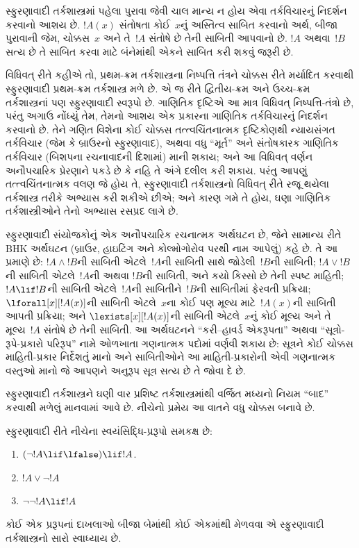 સ્ફુરણાવાદી તર્કશાસ્ત્રમાં પહેલા પુરાવા જેવી ચાલ માન્ય ન હોય એવા
તર્કવિચારનું નિદર્શન કરવાનો આશય છે. $!A(x)$ સંતોષતા કોઈ~$x$નું
અસ્તિત્વ સાબિત કરવાનો અર્થ, બીજા પુરાવાની જેમ, ચોક્કસ~$x$ અને તે~$!A$
સંતોષે છે તેની સાબિતી આપવાનો છે. $!A$ અથવા~$!B$ સત્ય છે તે સાબિત કરવા
માટે બંનેમાંથી એકને સાબિત કરી શકવું જરૂરી છે.

વિધિવત્ રીતે કહીએ તો, પ્રથમ-ક્રમ તર્કશાસ્ત્રના નિષ્પત્તિ તંત્રને
ચોક્કસ રીતે મર્યાદિત કરવાથી સ્ફુરણાવાદી પ્રથમ-ક્રમ તર્કશાસ્ત્ર મળે છે.
એ જ રીતે દ્વિતીય-ક્રમ અને ઉચ્ચ-ક્રમ તર્કશાસ્ત્રનાં પણ સ્ફુરણાવાદી
સ્વરૂપો છે. ગાણિતિક દૃષ્ટિએ આ માત્ર વિધિવત્ નિષ્પત્તિ-તંત્રો છે, પરંતુ
અગાઉ નોંધ્યું તેમ, તેમનો આશય એક પ્રકારના ગાણિતિક તર્કવિચારનું નિદર્શન
કરવાનો છે. તેને ગણિત વિશેના કોઈ ચોક્કસ તત્ત્વચિંતનાત્મક દૃષ્ટિકોણથી
ન્યાયસંગત તર્કવિચાર (જેમ કે બ્રાઉરનો સ્ફુરણાવાદ), અથવા વધુ ``મૂર્ત''
અને સંતોષકારક ગાણિતિક તર્કવિચાર (બિશપના રચનાવાદની દિશામાં) માની શકાય;
અને આ વિધિવત્ વર્ણન અનૌપચારિક પ્રેરણાને પકડે છે કે નહિ તે અંગે દલીલ
કરી શકાય. પરંતુ આપણું તત્ત્વચિંતનાત્મક વલણ જે હોય તે, સ્ફુરણાવાદી
તર્કશાસ્ત્રનો વિધિવત્ રીતે રજૂ થયેલા તર્કશાસ્ત્ર તરીકે અભ્યાસ કરી
શકીએ છીએ; અને કારણ ગમે તે હોય, ઘણા ગાણિતિક તર્કશાસ્ત્રીઓને તેનો
અભ્યાસ રસપ્રદ લાગે છે.

સ્ફુરણાવાદી સંયોજકોનું એક અનૌપચારિક રચનાત્મક અર્થઘટન છે, જેને સામાન્ય
રીતે BHK અર્થઘટન (બ્રાઉર, હાઇટિંગ અને કોલ્મોગોરોવ પરથી નામ આપેલું)
કહે છે. તે આ પ્રમાણે છે: $!A \land !B$ની સાબિતી એટલે~$!A$ની સાબિતી
સાથે જોડેલી~$!B$ની સાબિતી; $!A \lor !B$ની સાબિતી એટલે~$!A$ની અથવા
$!B$ની સાબિતી, અને કયો કિસ્સો છે તેની સ્પષ્ટ માહિતી; $!A \lif !B$ની
સાબિતી એટલે~$!A$ની સાબિતીને~$!B$ની સાબિતીમાં ફેરવતી પ્રક્રિયા;
$\lforall[x][!A(x)]$ની સાબિતી એટલે~$x$ના કોઈ પણ મૂલ્ય માટે~$!A(x)$ની
સાબિતી આપતી પ્રક્રિયા; અને $\lexists[x][!A(x)]$ની સાબિતી એટલે~$x$નું
કોઈ મૂલ્ય અને તે મૂલ્ય~$!A$ સંતોષે છે તેની સાબિતી. આ અર્થઘટનને
``કરી--હાવર્ડ એકરૂપતા'' અથવા ``સૂત્રો-રૂપે-પ્રકારો પરિરૂપ'' નામે
ઓળખાતા ગણનાત્મક પદોમાં વર્ણવી શકાય છે: સૂત્રને કોઈ ચોક્કસ
માહિતી-પ્રકાર નિર્દેશતું માનો અને સાબિતીઓને આ માહિતી-પ્રકારોની એવી
ગણનાત્મક વસ્તુઓ માનો જે આપણને અનુરૂપ સૂત્ર સત્ય છે તે જોવા દે છે.

સ્ફુરણાવાદી તર્કશાસ્ત્રને ઘણી વાર પ્રશિષ્ટ તર્કશાસ્ત્રમાંથી વર્જિત
મધ્યનો નિયમ ``બાદ'' કરવાથી મળેલું માનવામાં આવે છે. નીચેનો પ્રમેય આ
વાતને વધુ ચોક્કસ બનાવે છે.
\begin{thm}
સ્ફુરણાવાદી રીતે નીચેના સ્વયંસિદ્ધિ-પ્રરૂપો સમકક્ષ છે:
\begin{enumerate}
\item $(\lnot !A \lif \lfalse) \lif !A$.
\item $!A \lor \lnot !A$
\item $\lnot \lnot !A \lif !A$
\end{enumerate}
\end{thm}
કોઈ એક પ્રરૂપનાં દાખલાઓ બીજા બેમાંથી કોઈ એકમાંથી મેળવવા એ સ્ફુરણાવાદી
તર્કશાસ્ત્રનો સારો સ્વાધ્યાય છે.

